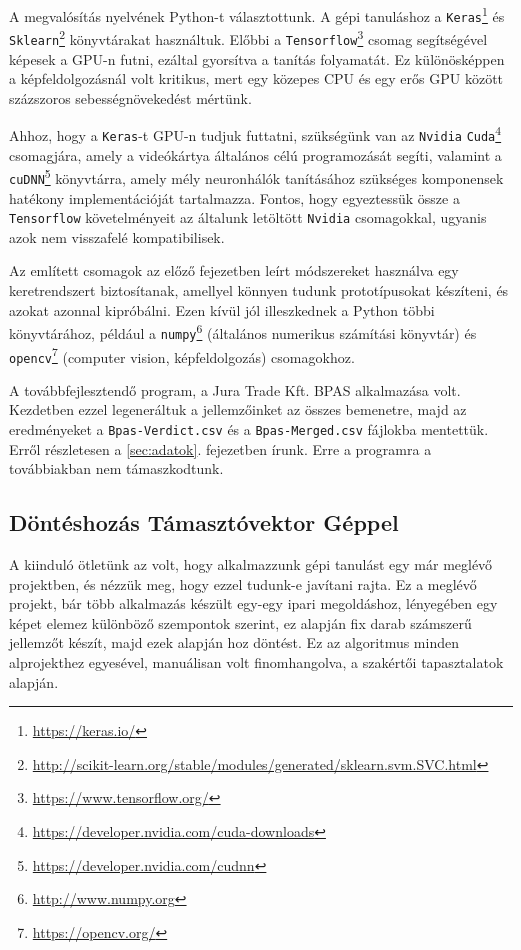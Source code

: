 A megvalósítás nyelvének Python-t választottunk.
A gépi tanuláshoz a \texttt{Keras}\footnote{\url{https://keras.io/}} \cite{chollet2015keras} és \texttt{Sklearn}\footnote{\url{http://scikit-learn.org/stable/modules/generated/sklearn.svm.SVC.html}} \cite{pedregosa2011scikit} könyvtárakat 
használtuk. Előbbi a \texttt{Tensorflow}\footnote{\url{https://www.tensorflow.org/}} \cite{abadi2016tensorflow} csomag segítségével képesek a
GPU-n futni, ezáltal gyorsítva a tanítás folyamatát. Ez különösképpen a 
képfeldolgozásnál volt kritikus, mert egy közepes CPU és egy erős GPU között
százszoros sebességnövekedést mértünk.

Ahhoz, hogy a \texttt{Keras}-t GPU-n tudjuk futtatni, szükségünk van az \texttt{Nvidia}
\texttt{Cuda}\footnote{\url{https://developer.nvidia.com/cuda-downloads}} csomagjára, amely a videókártya általános célú programozását 
segíti, valamint a \texttt{cuDNN}\footnote{\url{https://developer.nvidia.com/cudnn}} könyvtárra, amely mély neuronhálók tanításához 
szükséges komponensek hatékony implementációját tartalmazza. Fontos, hogy egyeztessük
össze a \texttt{Tensorflow} követelményeit az általunk letöltött \texttt{Nvidia} csomagokkal,
ugyanis azok nem visszafelé kompatibilisek.

Az említett csomagok az előző fejezetben leírt módszereket használva egy
keretrendszert biztosítanak, amellyel könnyen tudunk prototípusokat készíteni,
és azokat azonnal kipróbálni. Ezen kívül jól illeszkednek a Python többi könyvtárához,
például a \texttt{numpy}\footnote{\url{http://www.numpy.org}} (általános numerikus számítási könyvtár) és \texttt{opencv}\footnote{\url{https://opencv.org/}}
(computer vision, képfeldolgozás) csomagokhoz.


A továbbfejlesztendő program, a Jura Trade Kft. BPAS alkalmazása volt. Kezdetben ezzel legeneráltuk
a jellemzőinket az összes bemenetre, majd az eredményeket a \texttt{Bpas-Verdict.csv} és
a \texttt{Bpas-Merged.csv} fájlokba mentettük. Erről részletesen a \ref{sec:adatok}.
fejezetben írunk. Erre a programra a továbbiakban nem támaszkodtunk.



\subsection{Döntéshozás Támasztóvektor Géppel}

A kiinduló ötletünk az volt, hogy alkalmazzunk gépi tanulást egy már meglévő projektben,
és nézzük meg, hogy ezzel tudunk-e javítani rajta. Ez a meglévő projekt, bár több 
alkalmazás készült egy-egy ipari megoldáshoz, lényegében egy képet elemez 
különböző szempontok szerint, ez alapján fix darab számszerű jellemzőt készít, 
majd ezek alapján hoz döntést. Ez az algoritmus minden alprojekthez egyesével,
manuálisan volt finomhangolva, a szakértői tapasztalatok alapján.

